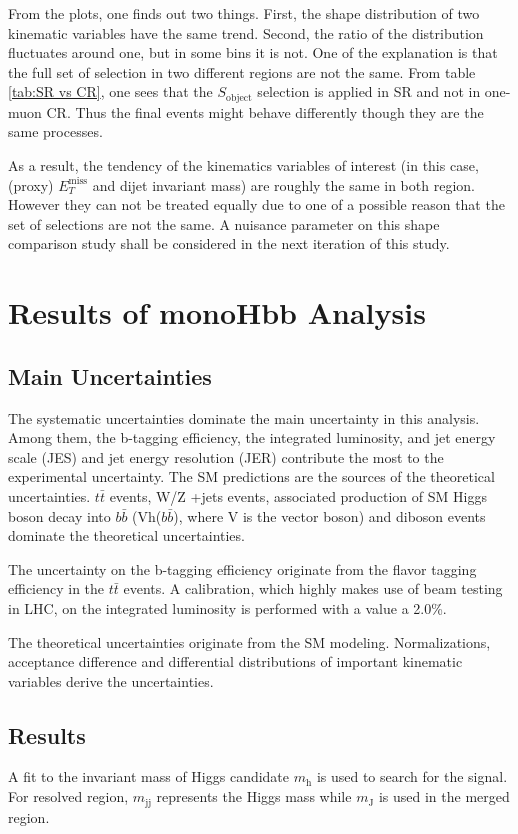 \documentclass[class=NCU_thesis, crop=false]{standalone}
\begin{document}
	From the plots, one finds out two things. First, the shape distribution of two kinematic variables have the same trend. Second, the ratio of the distribution fluctuates around one, but in some bins it is not. One of the explanation is that the full set of selection in two different regions are not the same. From table \ref{tab:SR vs CR}, one sees that the $S_{\mathrm{object}}$ selection is applied in SR and not in one-muon CR. Thus the final events might behave differently though they are the same processes.
	
	As a result, the tendency of the kinematics variables of interest (in this case, (proxy) $E_T^{\mathrm{miss}}$ and dijet invariant mass) are roughly the same in both region. However they can not be treated equally due to one of a possible reason that the set of selections are not the same. A nuisance parameter on this shape comparison study shall be considered in the next iteration of this study.


\chapter{Results of monoHbb Analysis}

\section{Main Uncertainties}
	The systematic uncertainties dominate the main uncertainty in this analysis. Among them, the b-tagging efficiency, the integrated luminosity, and jet energy scale (JES) and jet energy resolution (JER) contribute the most to the experimental uncertainty. The SM predictions are the sources of the theoretical uncertainties. $t\bar{t}$ events, W/Z +jets events, associated production of SM Higgs boson decay into $b\bar{b}$ (Vh($b\bar{b}$), where V is the vector boson) and diboson events dominate the theoretical uncertainties.
	
	The uncertainty on the b-tagging efficiency originate from the flavor tagging efficiency in the $t\bar{t}$ events. A calibration, which highly makes use of beam testing in LHC, on the integrated luminosity is performed with a value a 2.0\%.
	
	The theoretical uncertainties originate from the SM modeling. Normalizations, acceptance difference and differential distributions of important kinematic variables derive the uncertainties.
	
\section{Results}
	A fit to the invariant mass of Higgs candidate $m_{\mathrm{h}}$ is used to search for the signal. For resolved region, $m_{\mathrm{jj}}$ represents the Higgs mass while $m_{\mathrm{J}}$ is used in the merged region.
	
\end{document}
